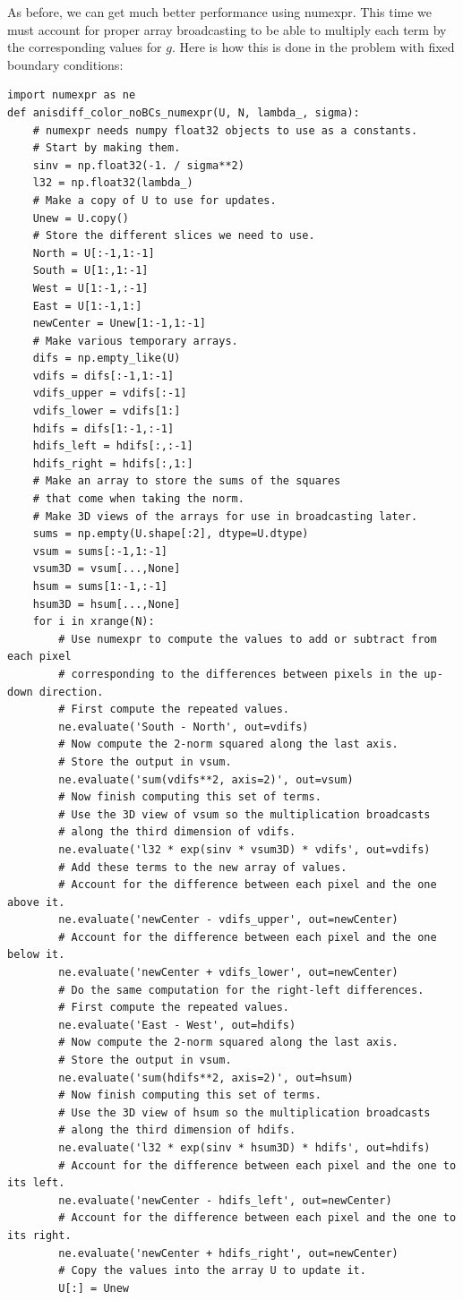 As before, we can get much better performance using numexpr.
This time we must account for proper array broadcasting to be able to multiply each term by the corresponding values for $g$.
Here is how this is done in the problem with fixed boundary conditions:
\begin{lstlisting}
import numexpr as ne
def anisdiff_color_noBCs_numexpr(U, N, lambda_, sigma):
    # numexpr needs numpy float32 objects to use as a constants.
    # Start by making them.
    sinv = np.float32(-1. / sigma**2)
    l32 = np.float32(lambda_)
    # Make a copy of U to use for updates.
    Unew = U.copy()
    # Store the different slices we need to use.
    North = U[:-1,1:-1]
    South = U[1:,1:-1]
    West = U[1:-1,:-1]
    East = U[1:-1,1:]
    newCenter = Unew[1:-1,1:-1]
    # Make various temporary arrays.
    difs = np.empty_like(U)
    vdifs = difs[:-1,1:-1]
    vdifs_upper = vdifs[:-1]
    vdifs_lower = vdifs[1:]
    hdifs = difs[1:-1,:-1]
    hdifs_left = hdifs[:,:-1]
    hdifs_right = hdifs[:,1:]
    # Make an array to store the sums of the squares
    # that come when taking the norm.
    # Make 3D views of the arrays for use in broadcasting later.
    sums = np.empty(U.shape[:2], dtype=U.dtype)
    vsum = sums[:-1,1:-1]
    vsum3D = vsum[...,None]
    hsum = sums[1:-1,:-1]
    hsum3D = hsum[...,None]
    for i in xrange(N):
        # Use numexpr to compute the values to add or subtract from each pixel
        # corresponding to the differences between pixels in the up-down direction.
        # First compute the repeated values.
        ne.evaluate('South - North', out=vdifs)
        # Now compute the 2-norm squared along the last axis.
        # Store the output in vsum.
        ne.evaluate('sum(vdifs**2, axis=2)', out=vsum)
        # Now finish computing this set of terms.
        # Use the 3D view of vsum so the multiplication broadcasts
        # along the third dimension of vdifs.
        ne.evaluate('l32 * exp(sinv * vsum3D) * vdifs', out=vdifs)
        # Add these terms to the new array of values.
        # Account for the difference between each pixel and the one above it.
        ne.evaluate('newCenter - vdifs_upper', out=newCenter)
        # Account for the difference between each pixel and the one below it.
        ne.evaluate('newCenter + vdifs_lower', out=newCenter)
        # Do the same computation for the right-left differences.
        # First compute the repeated values.
        ne.evaluate('East - West', out=hdifs)
        # Now compute the 2-norm squared along the last axis.
        # Store the output in vsum.
        ne.evaluate('sum(hdifs**2, axis=2)', out=hsum)
        # Now finish computing this set of terms.
        # Use the 3D view of hsum so the multiplication broadcasts
        # along the third dimension of hdifs.
        ne.evaluate('l32 * exp(sinv * hsum3D) * hdifs', out=hdifs)
        # Account for the difference between each pixel and the one to its left.
        ne.evaluate('newCenter - hdifs_left', out=newCenter)
        # Account for the difference between each pixel and the one to its right.
        ne.evaluate('newCenter + hdifs_right', out=newCenter)
        # Copy the values into the array U to update it.
        U[:] = Unew
\end{lstlisting}


